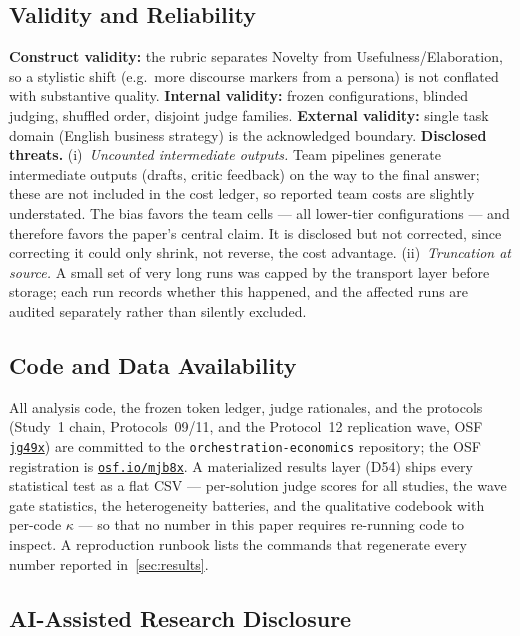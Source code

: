 \documentclass[12pt,a4paper]{article}
\begin{document}
\subsection{Validity and Reliability}

\textbf{Construct validity:} the rubric separates Novelty from
Usefulness/Elaboration, so a stylistic shift (e.g.\ more discourse markers from
a persona) is not conflated with substantive quality. \textbf{Internal validity:}
frozen configurations, blinded judging, shuffled order, disjoint judge families.
\textbf{External validity:} single task domain (English business strategy) is
the acknowledged boundary. \textbf{Disclosed threats.} (i)~\emph{Uncounted intermediate outputs.} Team
pipelines generate intermediate outputs (drafts, critic feedback) on the way to
the final answer; these are not included in the cost ledger, so reported team
costs are slightly understated. The bias favors the team cells --- all
lower-tier configurations --- and therefore favors the paper's central claim.
It is disclosed but not corrected, since correcting it could only shrink, not
reverse, the cost advantage. (ii)~\emph{Truncation at source.} A small set of
very long runs was capped by the transport layer before storage; each run
records whether this happened, and the affected runs are audited separately
rather than silently excluded.

\subsection{Code and Data Availability}

All analysis code, the frozen token ledger, judge rationales, and the
protocols (Study~1 chain, Protocols~09/11, and the Protocol~12 replication
wave, OSF \href{https://osf.io/jg49x}{\texttt{jg49x}}) are committed to the
\texttt{orchestration-economics} repository; the
OSF registration is \href{https://osf.io/mjb8x}{\texttt{osf.io/mjb8x}}.
A materialized results layer (D54) ships every statistical test as a flat CSV
--- per-solution judge scores for all studies, the wave gate statistics, the
heterogeneity batteries, and the qualitative codebook with per-code $\kappa$
--- so that no number in this paper requires re-running code to inspect.
A reproduction runbook
\citep{SandveEtAl2013} lists the commands that regenerate every number reported
in~\cref{sec:results}.

\subsection{AI-Assisted Research Disclosure}\label{sec:ai-disclosure}
\end{document}
